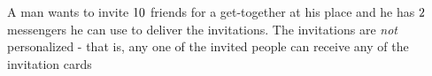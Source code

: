 

\setcounter{rolldice}{3}


\gcalcexpr[0]{\tmp}{\vbone - \vbtwo}
\gcalcexpr[0]{\per}{\vbone / \vbtwo}
\gcalcexpr[0]{\tp}{\vbone - \per}
\gcalcexpr[0]{\tq}{\tp - \per}

\question A man wants to invite $10$ friends for a get-together at his place and he has 
$2$ messengers he can use to deliver the invitations. The invitations are \textit{not}
personalized - that is, any one of the invited people can receive any of the invitation cards

\watchout

\ifprintanswers
 
\fi 

